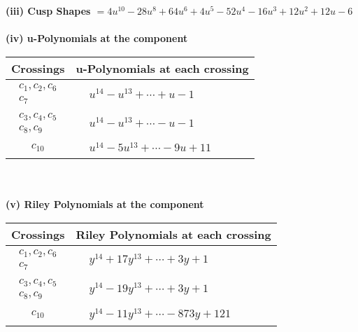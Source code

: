 \documentclass[1p]{elsarticle_modified}
\theoremstyle{definition}
\begin{document}
\flushleft \textbf{(iii) Cusp Shapes $= 4 u^{10}-28 u^8+64 u^6+4 u^5-52 u^4-16 u^3+12 u^2+12 u-6$}\\~\\
\newpage\renewcommand{\arraystretch}{1}
\flushleft \textbf{(iv) u-Polynomials at the component}\newline \\
\begin{tabular}{m{50pt}|m{274pt}}
Crossings & \hspace{64pt}u-Polynomials at each crossing \\
\hline $$\begin{aligned}c_{1},c_{2},c_{6}\\c_{7}\end{aligned}$$&$\begin{aligned}
&u^{14}- u^{13}+\cdots+u-1
\end{aligned}$\\
\hline $$\begin{aligned}c_{3},c_{4},c_{5}\\c_{8},c_{9}\end{aligned}$$&$\begin{aligned}
&u^{14}- u^{13}+\cdots- u-1
\end{aligned}$\\
\hline $$\begin{aligned}c_{10}\end{aligned}$$&$\begin{aligned}
&u^{14}-5 u^{13}+\cdots-9 u+11
\end{aligned}$\\
\hline
\end{tabular}\\~\\
\newpage\renewcommand{\arraystretch}{1}
\flushleft \textbf{(v) Riley Polynomials at the component}\newline \\
\begin{tabular}{m{50pt}|m{274pt}}
Crossings & \hspace{64pt}Riley Polynomials at each crossing \\
\hline $$\begin{aligned}c_{1},c_{2},c_{6}\\c_{7}\end{aligned}$$&$\begin{aligned}
&y^{14}+17 y^{13}+\cdots+3 y+1
\end{aligned}$\\
\hline $$\begin{aligned}c_{3},c_{4},c_{5}\\c_{8},c_{9}\end{aligned}$$&$\begin{aligned}
&y^{14}-19 y^{13}+\cdots+3 y+1
\end{aligned}$\\
\hline $$\begin{aligned}c_{10}\end{aligned}$$&$\begin{aligned}
&y^{14}-11 y^{13}+\cdots-873 y+121
\end{aligned}$\\
\hline
\end{tabular}\\~\\
\end{document}

